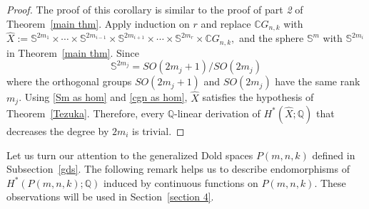 \documentclass{amsart}
\newcommand{\thmref}[1]{Theorem~\ref{#1}}
\newcommand{\secref}[1]{Section~\ref{#1}}
\newcommand{\subsecref}[1]{Subsection~\ref{#1}}
\begin{document}
	\begin{proof}
		The proof of this corollary is similar to the proof of %
part \textit{2} of \thmref{main thm}. Apply induction on $r$ and replace $\mathbb{C}G_{n,k}$ with $\hat{X} := \mathbb{S}^{2m_1}\times\cdots\times \mathbb{S}^{2m_{i-1}}\times \mathbb{S}^{2m_{i+1}}\times\cdots\times \mathbb{S}^{2m_r}\times \mathbb{C}G_{n,k},$ and the sphere $\mathbb{S}^m$ with $\mathbb{S}^{2m_i}$ in \thmref{main thm}. Since \begin{equation}\label{Sm as hom}
			\mathbb S^{2m_j}=SO(2m_j+1)/SO(2m_j)
		\end{equation}
		where %
the orthogonal groups $SO(2m_j+1)$ and $SO(2m_j)$ have the same rank $m_j$. Using \eqref{Sm as hom} and \eqref{cgn as hom}, $\hat{X}$ satisfies the hypothesis of \thmref{Tezuka}. Therefore, every $\mathbb{Q}$-linear derivation of $H^*(\hat{X};\mathbb{Q})$ that decreases the degree by $2m_i$ is trivial.
	\end{proof}
	Let us turn our attention to the generalized Dold spaces $P(m,n,k)$ %
defined in \subsecref{gds}. The following remark helps us to describe endomorphisms of $H^*(P(m,n,k);\mathbb{Q})$ %
induced by continuous functions on $P(m,n,k)$. These observations will be used in \secref{section 4}.
\end{document}

